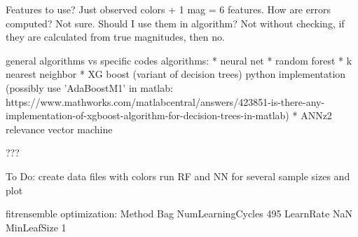 \documentclass[13pt]{amsart}
\begin{document}
Features to use? Just observed colors + 1 mag = 6 features.
How are errors computed? Not sure. Should I use them in algorithm? Not without checking, if they are calculated from true magnitudes, then no.


general algorithms vs specific codes
algorithms: 
	* neural net 
	* random forest
	* k nearest neighbor
	* XG boost (variant of decision trees) python implementation (possibly use 'AdaBoostM1' in matlab: https://www.mathworks.com/matlabcentral/answers/423851-is-there-any-implementation-of-xgboost-algorithm-for-decision-trees-in-matlab)
	* ANNz2
	relevance vector machine

???





To Do:
create data files with colors
run RF and NN for several sample sizes and plot


fitrensemble optimization:
Method Bag
NumLearningCycles 495
LearnRate NaN
MinLeafSize 1
\end{document}
